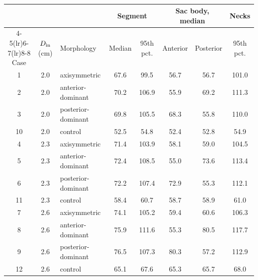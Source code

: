 \begin{table}[htbp]
\centering
\small
\caption{}
\label{tab:mps}
\begin{tabular}{cclccccc}
\toprule
 & & & \multicolumn{2}{c}{Segment} & \multicolumn{2}{c}{Sac body, median} & Necks \\
\cmidrule(lr){4-5}\cmidrule(lr){6-7}\cmidrule(lr){8-8}
Case & $D_{\rm in}$ (cm) & Morphology & Median & 95th pct. & Anterior & Posterior & 95th pct. \\
\midrule
1 & 2.0 & axisymmetric & 67.6 & 99.5 & 56.7 & 56.7 & 101.0 \\
2 & 2.0 & anterior-dominant & 70.2 & 106.9 & 55.9 & 69.2 & 111.3 \\
3 & 2.0 & posterior-dominant & 69.8 & 105.5 & 68.3 & 55.8 & 110.0 \\
10 & 2.0 & control & 52.5 & 54.8 & 52.4 & 52.8 & 54.9 \\
4 & 2.3 & axisymmetric & 71.4 & 103.9 & 58.1 & 59.0 & 104.5 \\
5 & 2.3 & anterior-dominant & 72.4 & 108.5 & 55.0 & 73.6 & 113.4 \\
6 & 2.3 & posterior-dominant & 72.2 & 107.4 & 72.9 & 55.3 & 112.1 \\
11 & 2.3 & control & 58.4 & 60.7 & 58.7 & 58.9 & 61.0 \\
7 & 2.6 & axisymmetric & 74.1 & 105.2 & 59.4 & 60.6 & 106.3 \\
8 & 2.6 & anterior-dominant & 75.9 & 111.6 & 55.3 & 80.5 & 117.7 \\
9 & 2.6 & posterior-dominant & 76.5 & 107.3 & 80.3 & 57.2 & 112.9 \\
12 & 2.6 & control & 65.1 & 67.6 & 65.3 & 65.7 & 68.0 \\
\bottomrule
\end{tabular}
\end{table}
